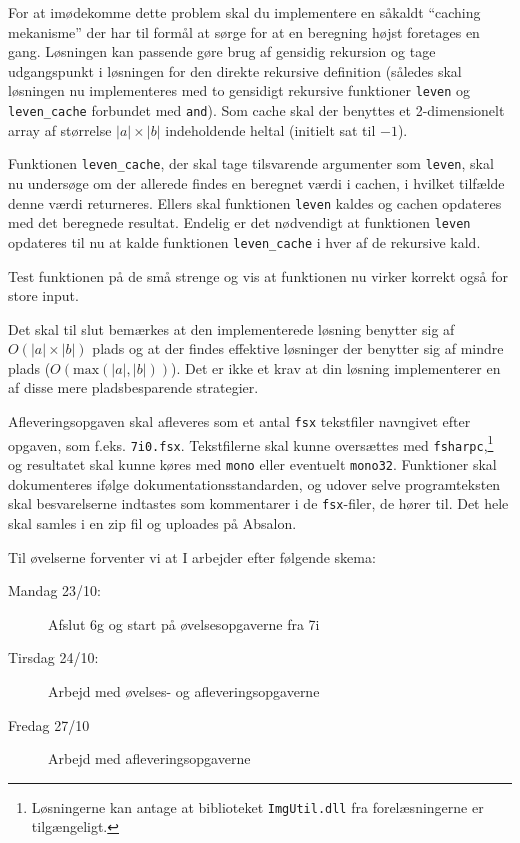 \documentclass[a4paper,12pt]{article}
\begin{document}
\begin{enumerate}[label=5i.\arabic*,start=3]
    For at imødekomme dette problem skal du implementere en såkaldt
    ``caching mekanisme'' der har til formål at sørge for at en
    beregning højst foretages en gang.  Løsningen kan passende gøre
    brug af gensidig rekursion og tage udgangspunkt i løsningen for
    den direkte rekursive definition (således skal løsningen nu
    implementeres med to gensidigt rekursive funktioner \lstinline{leven} og \lstinline{leven_cache} forbundet med
    \lstinline{and}). Som cache skal der benyttes et 2-dimensionelt
    array af størrelse $|a|\times|b|$ indeholdende heltal (initielt
    sat til $-1$).

    Funktionen \lstinline{leven_cache}, der skal tage tilsvarende
    argumenter som \lstinline{leven}, skal nu undersøge om der
    allerede findes en beregnet værdi i cachen, i hvilket tilfælde
    denne værdi returneres. Ellers skal funktionen \lstinline{leven}
    kaldes og cachen opdateres med det beregnede resultat. Endelig er
    det nødvendigt at funktionen \lstinline{leven} opdateres til nu at
    kalde funktionen \lstinline{leven_cache} i hver af de rekursive kald.

    Test funktionen på de små strenge og vis at funktionen nu virker
    korrekt også for store input.

    Det skal til slut bemærkes at den implementerede løsning benytter
    sig af $O(|a| \times |b|)$ plads og at der findes effektive
    løsninger der benytter sig af mindre plads
    ($O(\mathrm{max}(|a|,|b|))$). Det er ikke et krav at din løsning
    implementerer en af disse mere pladsbesparende strategier.
\end{enumerate}

Afleveringsopgaven skal afleveres som et antal \texttt{fsx} tekstfiler
navngivet efter opgaven, som f.eks. \lstinline!7i0.fsx!. Tekstfilerne
skal kunne oversættes med \texttt{fsharpc},\footnote{Løsningerne kan
  antage at biblioteket \texttt{ImgUtil.dll} fra forelæsningerne er
  tilgængeligt.} og resultatet skal kunne køres med \texttt{mono}
eller eventuelt \texttt{mono32}. Funktioner skal dokumenteres ifølge
dokumentationsstandarden, og udover selve programteksten skal
besvarelserne indtastes som kommentarer i de \texttt{fsx}-filer, de
hører til. Det hele skal samles i en zip fil og uploades på Absalon.

Til øvelserne forventer vi at I arbejder efter følgende skema:
\begin{description}
\item[Mandag 23/10:] Afslut 6g og start på øvelsesopgaverne fra 7i
\item[Tirsdag 24/10:] Arbejd med øvelses- og afleveringsopgaverne
\item[Fredag 27/10] Arbejd med afleveringsopgaverne
\end{description}
\end{document}

